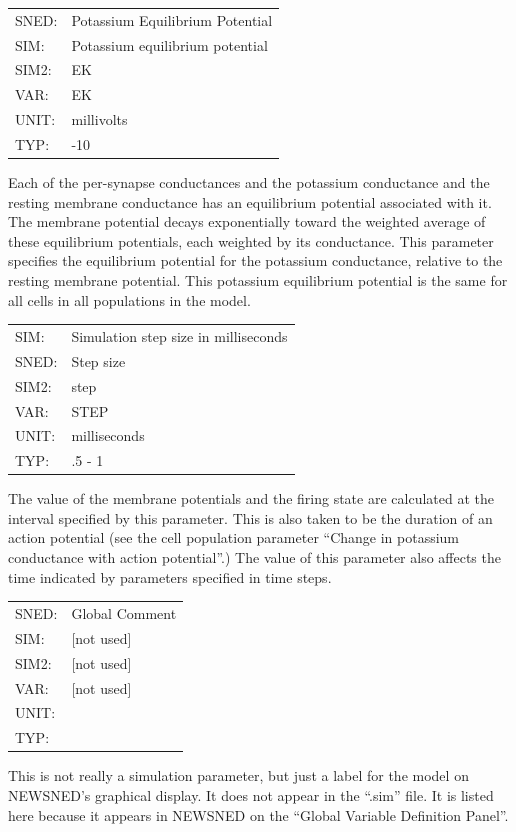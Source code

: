 \documentclass[12pt,openany,oneside]{book}
\begin{document}
\begin{flushleft}
\begin{tabular}{@{}ll@{}}
SNED: & Potassium Equilibrium Potential\\
SIM: & Potassium equilibrium potential\\
SIM2: & EK\\
VAR: & EK\\
UNIT: & millivolts\\
TYP: & -10\\
\end{tabular}
\end{flushleft}
\noindent
Each of the per-synapse conductances and the potassium conductance and
the resting membrane conductance has an equilibrium potential
associated with it.  The membrane potential decays exponentially
toward the weighted average of these equilibrium potentials, each
weighted by its conductance.  This parameter specifies the equilibrium
potential for the potassium conductance, relative to the resting
membrane potential.  This potassium equilibrium potential is the same
for all cells in all populations in the model.
\filbreak
\vspace{\baselineskip}

\begin{flushleft}
\begin{tabular}{@{}ll@{}}
\label{Simulation step size in milliseconds}
SIM: & Simulation step size in milliseconds\\
SNED: & Step size\\
SIM2: & step\\
VAR: & STEP\\
UNIT: & milliseconds\\
TYP: & .5 - 1\\
\end{tabular}
\end{flushleft}
\noindent
The value of the membrane potentials and the firing state are
calculated at the interval specified by this parameter.  This is also
taken to be the duration of an action potential (see the cell
population parameter ``Change in potassium conductance with action
potential''.)  The value of this parameter also affects the time
indicated by parameters specified in time steps.
\filbreak
\vspace{\baselineskip}

\begin{flushleft}
\begin{tabular}{@{}ll@{}}
SNED: & Global Comment\\
SIM: & [not used]\\
SIM2: & [not used]\\
VAR: & [not used]\\
UNIT: &\\
TYP: &\\
\end{tabular}
\end{flushleft}
\noindent
This is not really a simulation parameter, but just a label for the
model on NEWSNED's graphical display.  It does not appear in the
``.sim'' file.  It is listed here because it appears in NEWSNED on the
``Global Variable Definition Panel''.
\filbreak
\vspace{\baselineskip}
\end{document}
